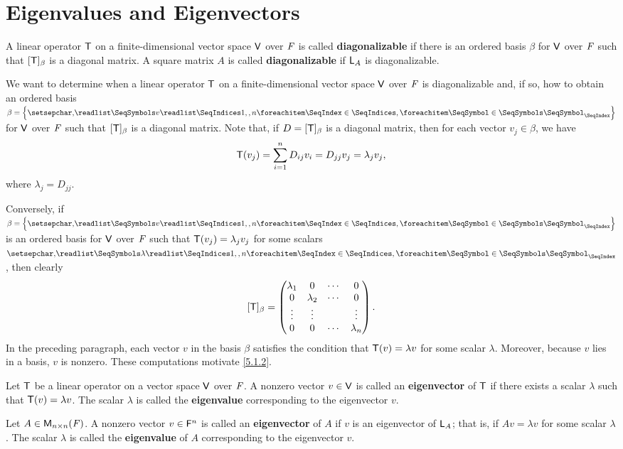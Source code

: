 \section{Eigenvalues and Eigenvectors}\label{sec:5.1}

\begin{defn}\label{5.1.1}
	A linear operator \(\mathsf{T}\) on a finite-dimensional vector space \(\mathsf{V}\) over \(\mathit{F}\) is called \textbf{diagonalizable} if there is an ordered basis \(\beta\) for \(\mathsf{V}\) over \(\mathit{F}\) such that \([\mathsf{T}]_{\beta}\) is a diagonal matrix.
	A square matrix \(A\) is called \textbf{diagonalizable} if \(\mathsf{L}_A\) is diagonalizable.
\end{defn}

\begin{note}
	We want to determine when a linear operator \(\mathsf{T}\) on a finite-dimensional vector space \(\mathsf{V}\) over \(\mathit{F}\) is diagonalizable and, if so, how to obtain an ordered basis \(\beta = \set{\seq{v}{1,,n}}\) for \(\mathsf{V}\) over \(\mathit{F}\) such that \([\mathsf{T}]_{\beta}\) is a diagonal matrix.
	Note that, if \(D = [\mathsf{T}]_{\beta}\) is a diagonal matrix, then for each vector \(v_j \in \beta\), we have
	\[
		\mathsf{T}(v_j) = \sum_{i = 1}^n D_{i j} v_i = D_{j j} v_j = \lambda_j v_j,
	\]
	where \(\lambda_j = D_{j j}\).

	Conversely, if \(\beta = \set{\seq{v}{1,,n}}\) is an ordered basis for \(\mathsf{V}\) over \(\mathit{F}\) such that \(\mathsf{T}(v_j) = \lambda_j v_j\) for some scalars \(\seq{\lambda}{1,,n}\), then clearly
	\[
		[\mathsf{T}]_{\beta} = \begin{pmatrix}
			\lambda_1 & 0         & \cdots & 0         \\
			0         & \lambda_2 & \cdots & 0         \\
			\vdots    & \vdots    &        & \vdots    \\
			0         & 0         & \cdots & \lambda_n
		\end{pmatrix}.
	\]
	In the preceding paragraph, each vector \(v\) in the basis \(\beta\) satisfies the condition that \(\mathsf{T}(v) = \lambda v\) for some scalar \(\lambda\).
	Moreover, because \(v\) lies in a basis, \(v\) is nonzero.
	These computations motivate \cref{5.1.2}.
\end{note}

\begin{defn}\label{5.1.2}
	Let \(\mathsf{T}\) be a linear operator on a vector space \(\mathsf{V}\) over \(\mathit{F}\).
	A nonzero vector \(v \in \mathsf{V}\) is called an \textbf{eigenvector} of \(\mathsf{T}\) if there exists a scalar \(\lambda\) such that \(\mathsf{T}(v) = \lambda v\).
	The scalar \(\lambda\) is called the \textbf{eigenvalue} corresponding to the eigenvector \(v\).

	Let \(A \in \mathsf{M}_{{n} \times n}({\mathit{F}})\).
	A nonzero vector \(v \in \mathsf{F}^n\) is called an \textbf{eigenvector} of \(A\) if \(v\) is an eigenvector of \(\mathsf{L}_A\);
	that is, if \(Av = \lambda v\) for some scalar \(\lambda\).
	The scalar \(\lambda\) is called the \textbf{eigenvalue} of \(A\) corresponding to the eigenvector \(v\).
\end{defn}

